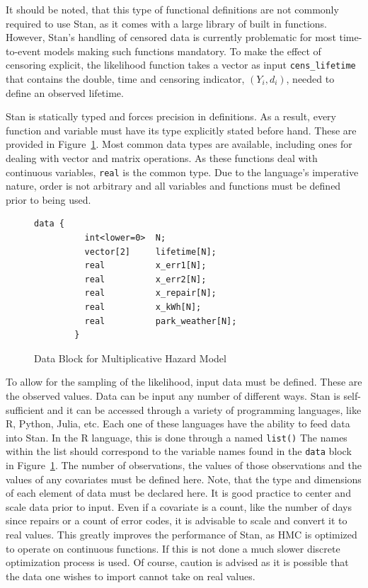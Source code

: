 It should be noted, that this type of functional definitions are not commonly required to use Stan, as it comes with a large library of built in functions\cite{StanDevelopmentTeam2016}. However, Stan's handling of censored data is currently problematic for most time-to-event models making such functions mandatory. To make the effect of censoring explicit, the likelihood function takes a vector as input \lstinline{cens_lifetime} that contains the double, time and censoring indicator, $(Y_i,d_i)$, needed to define an observed lifetime. 

Stan is statically typed and forces precision in definitions. As a result, every function and variable must have its type explicitly stated before hand. These are provided in Figure~\ref{mhaz_data}. Most common data types are available, including ones for dealing with vector and matrix operations. As these functions deal with continuous variables, \lstinline{real} is the common type. Due to the language's imperative nature, order is not arbitrary and all variables and functions must be defined prior to being used. 


\begin{figure}[htbp]
    \centering
    \begin{lstlisting}[belowskip=-2 \baselineskip]
		data {
		  int<lower=0>  N;
		  vector[2]     lifetime[N];
		  real          x_err1[N];
		  real          x_err2[N];
		  real          x_repair[N];
		  real          x_kWh[N];
		  real          park_weather[N];
		}
    \end{lstlisting}
    \caption{Data Block for Multiplicative Hazard Model}
    \label{mhaz_data}
\end{figure}


To allow for the sampling of the likelihood, input data must be defined. These are the observed values. Data can be input any number of different ways. Stan is self-sufficient and it can be accessed through a variety of programming languages, like R, Python, Julia, etc. Each one of these languages have the ability to feed data into Stan. In the R language, this is done through a named \lstinline{list()} The names within the list should correspond to the variable names found in the \lstinline{data} block in Figure~\ref{mhaz_data}. The number of observations, the values of those observations and the values of any covariates must be defined here. Note, that the type and dimensions of each element of data must be declared here. It is good practice to center and scale data prior to input. Even if a covariate is a count, like the number of days since repairs or a count of error codes, it is advisable to scale and convert it to real values. This greatly improves the performance of Stan, as HMC is optimized to operate on continuous functions. If this is not done a much slower discrete optimization process is used. Of course, caution is advised as it is possible that the data one wishes to import cannot take on real values. 


